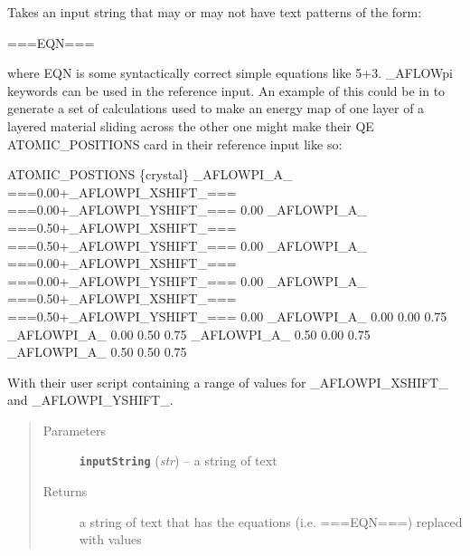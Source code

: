 \documentclass[letterpaper,10pt,english]{sphinxmanual}
\begin{document}
\begin{fulllineitems}
\label{prep:prep.__resolveEqualities}
Takes an input string that may or may not have text patterns of the form:

===EQN===

where EQN is some syntactically correct simple equations like 5+3. \_AFLOWpi keywords
can be used in the reference input. An example of this could be in to generate a set
of calculations used to make an energy map of one layer of a layered material sliding
across the other one might make their QE ATOMIC\_POSITIONS card in their reference
input like so:

ATOMIC\_POSTIONS \{crystal\}
\_AFLOWPI\_A\_ ===0.00+\_AFLOWPI\_XSHIFT\_===  ===0.00+\_AFLOWPI\_YSHIFT\_===  0.00
\_AFLOWPI\_A\_ ===0.50+\_AFLOWPI\_XSHIFT\_===  ===0.50+\_AFLOWPI\_YSHIFT\_===  0.00
\_AFLOWPI\_A\_ ===0.00+\_AFLOWPI\_XSHIFT\_===  ===0.00+\_AFLOWPI\_YSHIFT\_===  0.00
\_AFLOWPI\_A\_ ===0.50+\_AFLOWPI\_XSHIFT\_===  ===0.50+\_AFLOWPI\_YSHIFT\_===  0.00
\_AFLOWPI\_A\_ 0.00                     0.00                     0.75
\_AFLOWPI\_A\_ 0.00                     0.50                     0.75
\_AFLOWPI\_A\_ 0.50                     0.00                     0.75
\_AFLOWPI\_A\_ 0.50                     0.50                     0.75

With their user script containing a range of values for \_AFLOWPI\_XSHIFT\_ and \_AFLOWPI\_YSHIFT\_.
\begin{quote}\begin{description}
\item[{Parameters}] \leavevmode
\textbf{\texttt{inputString}} (\emph{str}) -- a string of text

\item[{Returns}] \leavevmode
a string of text that has the equations (i.e. ===EQN===) replaced with values

\end{description}\end{quote}

\end{fulllineitems}

\end{document}
